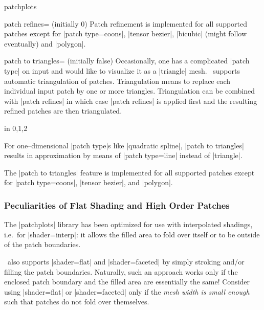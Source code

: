 {\begin{pgfplotslibrary}{patchplots}
\begin{pgfplotskey}{patch refines= (initially 0)}
	Patch refinement is implemented for all supported patches except for |patch type=coons|, |tensor bezier|, |bicubic| (might follow eventually) and |polygon|.
\end{pgfplotskey}

\begin{pgfplotskey}{patch to triangles= (initially false)}
	Occasionally, one has a complicated |patch type| on input and would like to visualize it as a |triangle| mesh. \PGFPlots\ supports automatic triangulation of patches. Triangulation means to replace each individual input patch by one or more triangles. Triangulation can be combined with |patch refines| in which case |patch refines| is applied first and the resulting refined patches are then triangulated.
\begin{codeexample}[]
\foreach \level in {0,1,2} {%
}
\end{codeexample}
	
	For one--dimensional |patch type|s like |quadratic spline|, |patch to triangles| results in approximation by means of |patch type=line| instead of |triangle|. 

	The |patch to triangles| feature is implemented for all supported patches except for |patch type=coons|, |tensor bezier|, and |polygon|.
\end{pgfplotskey}

\subsubsection{Peculiarities of Flat Shading and High Order Patches}
\label{sec:lib:patchplots:flat}
The |patchplots| library has been optimized for use with interpolated shadings, i.e.\ for |shader=interp|: it allows the filled area to fold over itself or to be outside of the patch boundaries.

\PGFPlots\ also supports |shader=flat| and |shader=faceted| by simply stroking and/or filling the patch boundaries. Naturally, such an approach works only if the enclosed patch boundary and the filled area are essentially the same! Consider using |shader=flat| or |shader=faceted| only if the \emph{mesh width is small enough} such that patches do not fold over themselves.


\end{pgfplotslibrary}}
